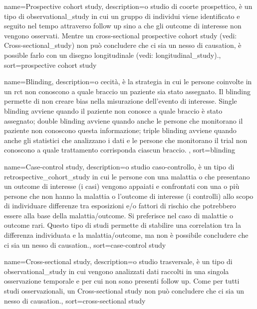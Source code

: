 {
	 name={Prospective cohort study},
	 description={o studio di coorte prospettico, \`e un tipo di \gls{observational_study} in cui un gruppo di individui viene identificato e seguito nel tempo attraverso follow up sino a che gli outcome di interesse non vengono osservati. Mentre un cross-sectional prospective cohort study (vedi: \gls{Cross-sectional_study}) non pu\`o concludere che ci sia un nesso di \gls{causation}, \`e possible farlo con un disegno longitudinale (vedi: \gls{longitudinal_study}).},
	 sort={prospective cohort study}
}

{
	 name={Blinding},
	 description={o cecit\`a, \`e la strategia in cui le persone coinvolte in un \gls{rct} non conoscono a quale braccio un paziente sia stato assegnato. Il blinding permette di non creare bias nella misurazione dell'evento di interesse. Single blinding avviene quando il paziente non conosce a quale braccio \`e stato assegnato; double blinding avviene quando anche le persone che monitorano il paziente non conoscono questa informazione; triple blinding avviene quando anche gli statistici che analizzano i dati e le persone che monitorano il trial non conoscono a quale trattamento corrisponda ciascun braccio. },
	 sort={blinding}
}

{
	 name={Case-control study},
	 description={o studio caso-controllo, \`e un tipo di \gls{retrospective_cohort_study} in cui le persone con una malattia o che presentano un outcome di interesse (i casi) vengono appaiati e confrontati con una o pi\`u persone che non hanno la malattia o l'outcome di interesse (i controlli) allo scopo di individuare differenze tra esposizioni e/o fattori di rischio che potrebbero essere alla base della malattia/outcome. Si preferisce nel caso di malattie o outcome rari. Questo tipo di studi permette di stabilire una \gls{correlation} tra la differenza individuata e la malattia/outcome, ma non \`e possibile concludere che ci sia un nesso di \gls{causation}.},
	 sort={case-control study}
}

{
	 name={Cross-sectional study},
	 description={o studio trasversale, \`e un tipo di \gls{observational_study} in cui vengono analizzati dati raccolti in una singola osservazione temporale e per cui non sono presenti follow up. Come per tutti studi osservazionali, un Cross-sectional study non pu\`o concludere che ci sia un nesso di \gls{causation}.},
	 sort={cross-sectional study}
}

